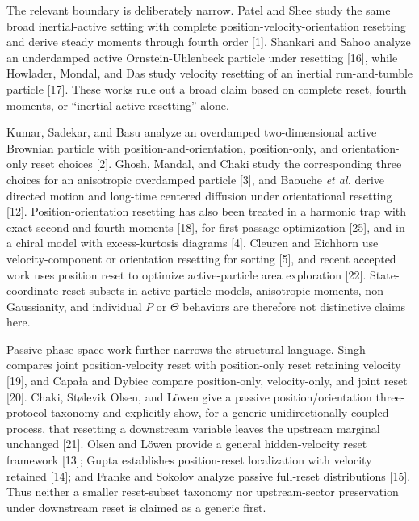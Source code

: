 The relevant boundary is deliberately narrow. Patel and Shee study the same broad inertial-active setting with complete position-velocity-orientation resetting and derive steady moments through fourth order {[}1{]}. Shankari and Sahoo analyze an underdamped active Ornstein-Uhlenbeck particle under resetting {[}16{]}, while Howlader, Mondal, and Das study velocity resetting of an inertial run-and-tumble particle {[}17{]}. These works rule out a broad claim based on complete reset, fourth moments, or ``inertial active resetting'' alone.

Kumar, Sadekar, and Basu analyze an overdamped two-dimensional active Brownian particle with position-and-orientation, position-only, and orientation-only reset choices {[}2{]}. Ghosh, Mandal, and Chaki study the corresponding three choices for an anisotropic overdamped particle {[}3{]}, and Baouche \emph{et al.} derive directed motion and long-time centered diffusion under orientational resetting {[}12{]}. Position-orientation resetting has also been treated in a harmonic trap with exact second and fourth moments {[}18{]}, for first-passage optimization {[}25{]}, and in a chiral model with excess-kurtosis diagrams {[}4{]}. Cleuren and Eichhorn use velocity-component or orientation resetting for sorting {[}5{]}, and recent accepted work uses position reset to optimize active-particle area exploration {[}22{]}. State-coordinate reset subsets in active-particle models, anisotropic moments, non-Gaussianity, and individual \(P\) or \(\Theta\) behaviors are therefore not distinctive claims here.

Passive phase-space work further narrows the structural language. Singh compares joint position-velocity reset with position-only reset retaining velocity {[}19{]}, and Capała and Dybiec compare position-only, velocity-only, and joint reset {[}20{]}. Chaki, Stølevik Olsen, and Löwen give a passive position/orientation three-protocol taxonomy and explicitly show, for a generic unidirectionally coupled process, that resetting a downstream variable leaves the upstream marginal unchanged {[}21{]}. Olsen and Löwen provide a general hidden-velocity reset framework {[}13{]}; Gupta establishes position-reset localization with velocity retained {[}14{]}; and Franke and Sokolov analyze passive full-reset distributions {[}15{]}. Thus neither a smaller reset-subset taxonomy nor upstream-sector preservation under downstream reset is claimed as a generic first.

